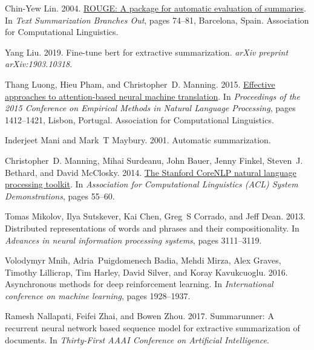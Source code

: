 \documentclass[11pt,a4paper]{article}
\begin{document}
\begin{thebibliography}{46}
Chin-Yew Lin. 2004.
\newblock \href {https://www.aclweb.org/anthology/W04-1013} {{ROUGE}: A package
  for automatic evaluation of summaries}.
\newblock In \emph{Text Summarization Branches Out}, pages 74--81, Barcelona,
  Spain. Association for Computational Linguistics.

Yang Liu. 2019.
\newblock Fine-tune bert for extractive summarization.
\newblock \emph{arXiv preprint arXiv:1903.10318}.

Thang Luong, Hieu Pham, and Christopher~D. Manning. 2015.
\newblock \href {https://doi.org/10.18653/v1/D15-1166} {Effective approaches to
  attention-based neural machine translation}.
\newblock In \emph{Proceedings of the 2015 Conference on Empirical Methods in
  Natural Language Processing}, pages 1412--1421, Lisbon, Portugal. Association
  for Computational Linguistics.

Inderjeet Mani and Mark~T Maybury. 2001.
\newblock Automatic summarization.

Christopher~D. Manning, Mihai Surdeanu, John Bauer, Jenny Finkel, Steven~J.
  Bethard, and David McClosky. 2014.
\newblock \href {http://www.aclweb.org/anthology/P/P14/P14-5010} {The
  {Stanford} {CoreNLP} natural language processing toolkit}.
\newblock In \emph{Association for Computational Linguistics (ACL) System
  Demonstrations}, pages 55--60.

Tomas Mikolov, Ilya Sutskever, Kai Chen, Greg~S Corrado, and Jeff Dean. 2013.
\newblock Distributed representations of words and phrases and their
  compositionality.
\newblock In \emph{Advances in neural information processing systems}, pages
  3111--3119.

Volodymyr Mnih, Adria~Puigdomenech Badia, Mehdi Mirza, Alex Graves, Timothy
  Lillicrap, Tim Harley, David Silver, and Koray Kavukcuoglu. 2016.
\newblock Asynchronous methods for deep reinforcement learning.
\newblock In \emph{International conference on machine learning}, pages
  1928--1937.

Ramesh Nallapati, Feifei Zhai, and Bowen Zhou. 2017.
\newblock Summarunner: A recurrent neural network based sequence model for
  extractive summarization of documents.
\newblock In \emph{Thirty-First AAAI Conference on Artificial Intelligence}.


\end{thebibliography}
\end{document}
